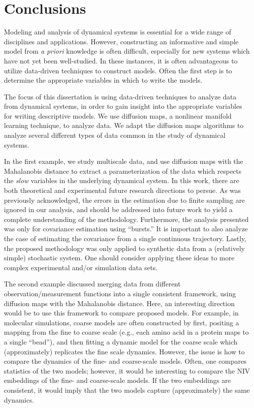
\chapter{Conclusions \label{ch:conclusion}}

Modeling and analysis of dynamical systems is essential for a wide range of disciplines and applications. 
%
However, constructing an informative and simple model from {\em a priori} knowledge is often difficult, especially for new systems which have not yet been well-studied. 
%
In these instances, it is often advantageous to utilize data-driven techniques to construct models.
%
Often the first step is to determine the appropriate variables in which to write the models. 

The focus of this dissertation is using data-driven techniques to analyze data from dynamical systems, in order to gain insight into the appropriate variables for writing descriptive models. 
%
We use diffusion maps, a nonlinear manifold learning technique, to analyze data.
%
We adapt the diffusion maps algorithms to analyze several different types of data common in the study of dynamical systems. 

In the first example, we study multiscale data, and use diffusion maps with the Mahalanobis distance to extract a parameterization of the data which respects the {\em slow} variables in the underlying dynamical system. 
%
In this work, there are both theoretical and experimental future research directions to persue. 
%
As was previously acknowledged, the errors in the estimation due to finite sampling are ignored in our analysis, and should be addressed into future work to yield a complete understanding of the methodology. 
%
Furthermore, the analysis presented was only for covariance estimation using ``bursts.''
%
It is important to also analyze the case of estimating the covariance from a single continuous trajectory.
%
Lastly, the proposed methodology was only applied to synthetic data from a (relatively simple) stochastic system. 
%
One should consider applying these ideas to more complex experimental and/or simulation data sets. 

The second example discussed merging data from different observation/measurement functions into a single consistent framework, using diffusion maps with the Mahalanobis distance. 
%
Here, an interesting direction would be to use this framework to compare proposed models. 
%
For example, in molecular simulations, coarse models are often constructed by first, positing a mapping from the fine to coarse scale (e.g., each amino acid in a protein maps to a single ``bead''), and then fitting a dynamic model for the coarse scale which (approximately) replicates the fine scale dynamics. 
%
However, the issue is how to compare the dynamics of the fine- and coarse-scale models. 
%
Often, one compares statistics of the two models; however, it would be interesting to compare the NIV embeddings of the fine- and coarse-scale models. 
%
If the two embeddings are consistent, it would imply that the two models capture (approximately) the same dynamics. 


